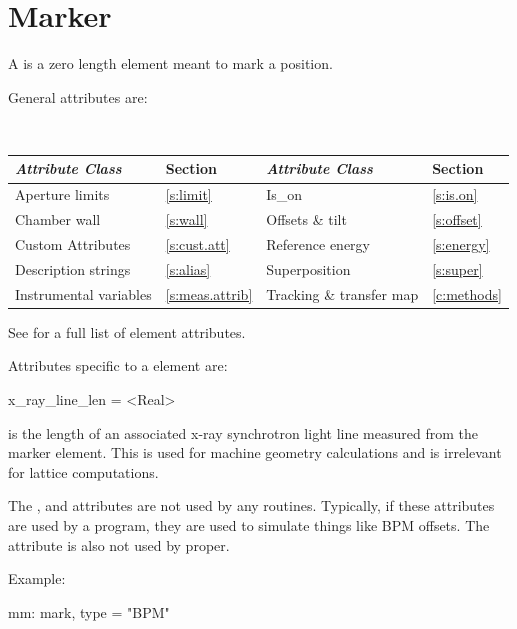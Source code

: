 {\section{Marker}
\label{s:mark}

A  is a zero length element meant to mark a position. 

General  attributes are:
\begin{center} 
\tt
\begin{tabular}{llll} \toprule
  {\sl Attribute Class}      & Section             & {\sl Attribute Class}        & Section         \\ \midrule
  Aperture limits            & \ref{s:limit}       &   Is_on                      & \ref{s:is.on}   \\ 
  Chamber wall               & \ref{s:wall}        & Offsets \& tilt              & \ref{s:offset}  \\
  Custom Attributes          & \ref{s:cust.att}    & Reference energy             & \ref{s:energy}  \\
  Description strings        & \ref{s:alias}       & Superposition                & \ref{s:super}   \\
  Instrumental variables     & \ref{s:meas.attrib} & Tracking \& transfer map     & \ref{c:methods} \\ 
  \bottomrule
\end{tabular}
\end{center}
\toffset
See  for a full list of element attributes.

Attributes specific to a  element are:
\begin{example}
  x_ray_line_len = <Real>
\end{example}

 is the length of an associated x-ray synchrotron
light line measured from the marker element. This is used for
machine geometry calculations and is irrelevant for lattice
computations.

The ,  and  attributes are not used
by any \bmad routines. Typically, if these attributes are used by a
program, they are used to simulate things like BPM offsets. The
 attribute is also not used by \bmad proper. 

Example:
\begin{example}
  mm: mark, type = "BPM"
\end{example}

}
